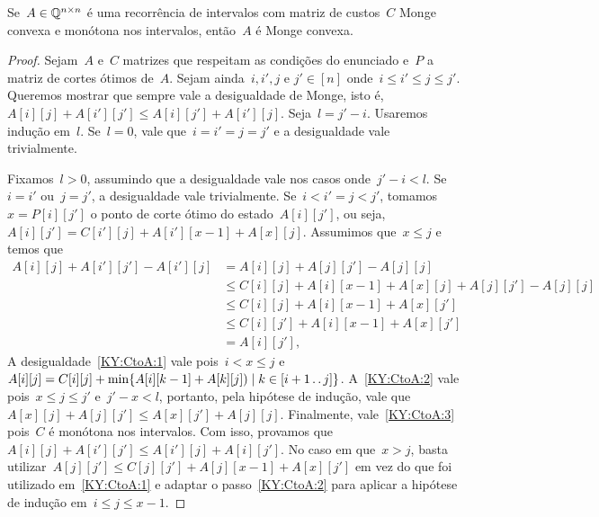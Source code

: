 \begin{lema} \label{KY:CtoA}
Se~$A \in \mathbb{Q}^{n \times n}$ é uma recorrência de intervalos com matriz de custos~$C$ Monge convexa e monótona nos intervalos, então~$A$ é Monge convexa.
\end{lema}

\begin{proof}
Sejam~$A$ e~$C$ matrizes que respeitam as condições do enunciado e~$P$ a matriz de cortes ótimos de~$A$. Sejam ainda~$i,i',j$ e $j' \in [n]$ onde~$i \leq i' \leq j \leq j'$. Queremos mostrar que sempre vale a desigualdade de Monge, isto é,~${A[i][j] + A[i'][j'] \leq A[i][j'] + A[i'][j]}$. Seja~$l = j' - i$. Usaremos indução em~$l$. Se~${l = 0}$, vale que~${i = i' = j = j'}$ e a desigualdade vale trivialmente.

Fixamos~$l > 0$, assumindo que a desigualdade vale nos casos onde~${j' - i < l}$. Se~$i = i'$ ou~$j = j'$, a desigualdade vale trivialmente. Se~${i < i' = j < j'}$, tomamos~${x = P[i][j']}$ o ponto de corte ótimo do estado~$A[i][j']$, ou seja,~${A[i][j'] = C[i'][j] + A[i'][x-1] + A[x][j]}$. Assumimos que~${x \leq j}$ e temos que
\begin{align}
A[i][j] + A[i'][j'] - A[i'][j] &= A[i][j] + A[j][j'] - A[j][j] \nonumber \\
                               &\leq C[i][j] + A[i][x-1] + A[x][j] + A[j][j'] - A[j][j] \label{KY:CtoA:1} \\
                               &\leq C[i][j] + A[i][x-1] + A[x][j'] \label{KY:CtoA:2} \\
                               &\leq C[i][j'] + A[i][x-1] + A[x][j'] \label{KY:CtoA:3} \\
                               &= A[i][j'] \text{,} \nonumber
\end{align}
A desigualdade~\eqref{KY:CtoA:1} vale pois~${i < x \leq j}$ e~${A[i][j] = C[i][j] + \min\limits \{ A[i][k-1] + A[k][j]) \mid k \in [i+1 \,.\,.\, j]\} }$. A~\eqref{KY:CtoA:2} vale pois~${x \leq j \leq j'}$ e~$j' - x < l$, portanto, pela hipótese de indução, vale que~${A[x][j] + A[j][j'] \leq A[x][j'] + A[j][j]}$. Finalmente, vale~\eqref{KY:CtoA:3} pois~$C$ é monótona nos intervalos. Com isso, provamos que~${A[i][j] + A[i'][j'] \leq A[i'][j] + A[i][j']}$. No caso em que~${x > j}$, basta utilizar~${A[j][j'] \leq C[j][j'] + A[j][x-1] + A[x][j']}$ em vez do que foi utilizado em~\eqref{KY:CtoA:1} e adaptar o passo~\eqref{KY:CtoA:2} para aplicar a hipótese de indução em~${i \leq j \leq x-1}$.


\end{proof}
